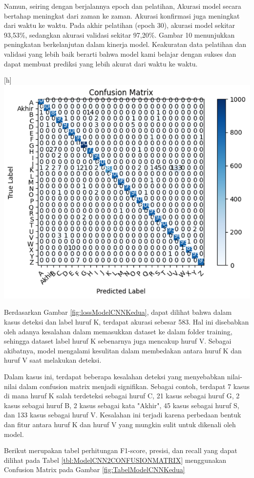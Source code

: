 Namun, seiring dengan berjalannya epoch dan pelatihan, Akurasi model secara bertahap meningkat dari zaman ke zaman. Akurasi konfirmasi juga meningkat dari waktu ke waktu. Pada akhir pelatihan (epoch 30), akurasi model sekitar 93,53\%, sedangkan akurasi validasi sekitar 97,20\%. Gambar 10 menunjukkan peningkatan berkelanjutan dalam kinerja model. Keakuratan data pelatihan dan validasi yang lebih baik berarti bahwa model kami belajar dengan sukses dan dapat membuat prediksi yang lebih akurat dari waktu ke waktu. 	

\begin{center}[h]
	\includegraphics[width=0.7\linewidth]{gambar/bener/ConfusionMatrix_ModelCNN2.png}
	\label{fig:TabelModelCNNKedua}
\end{center}
Berdasarkan Gambar \ref{fig:lossModelCNNKedua}, dapat dilihat bahwa dalam kasus deteksi dan label huruf K, terdapat akurasi sebesar 583. Hal ini disebabkan oleh adanya kesalahan dalam memasukkan dataset ke dalam folder training, sehingga dataset label huruf K sebenarnya juga mencakup huruf V. Sebagai akibatnya, model mengalami kesulitan dalam membedakan antara huruf K dan huruf V saat melakukan deteksi.

Dalam kasus ini, terdapat beberapa kesalahan deteksi yang menyebabkan nilai-nilai dalam confusion matrix menjadi signifikan. Sebagai contoh, terdapat 7 kasus di mana huruf K salah terdeteksi sebagai huruf C, 21 kasus sebagai huruf G, 2 kasus sebagai huruf B, 2 kasus sebagai kata "Akhir", 45 kasus sebagai huruf S, dan 133 kasus sebagai huruf V. Kesalahan ini terjadi karena perbedaan bentuk dan fitur antara huruf K dan huruf V yang mungkin sulit untuk dikenali oleh model.

Berikut merupakan tabel perhitungan F1-score, presisi, dan recall yang dapat dilihat pada Tabel \ref{tbl:ModelCNN2CONFUSIONMATRIX} menggunakan Confusion Matrix pada Gambar \ref{fig:TabelModelCNNKedua}

